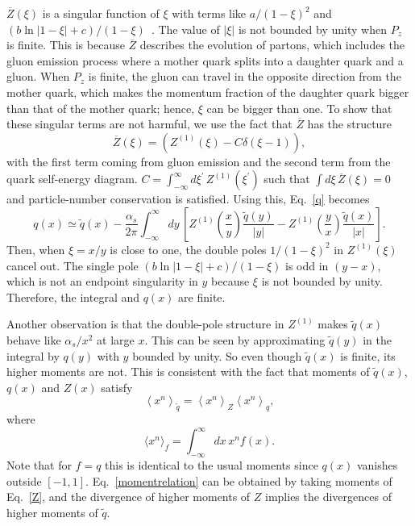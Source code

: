 $\overline{Z}(\xi)$ is a singular function of $\xi$ with terms like
$a/\left(1-\xi\right)^2$ and
$\left(b\ln \left\vert 1-\xi \right\vert + c\right)/(1-\xi)$~\cite{Xiong:2013bka}. The value of $\left\vert \xi \right\vert$ is not bounded by unity when $P_z$ is
finite. This is because $\overline{Z}$ describes the evolution of partons, which
includes the gluon emission process where a mother quark splits into a daughter
quark and a gluon. When $P_z$ is finite, the gluon can travel in the opposite
direction from the mother quark, which makes the momentum fraction of the
daughter quark bigger than that of the mother quark; hence, $\xi$ can be bigger
than one. To show that these singular terms are not harmful, we use the fact
that $\overline{Z}$ has the structure
%
\begin{equation}
\overline{Z}(\xi) = \left(Z^{(1)}(\xi) - C\delta(\xi-1)\right),
\end{equation}
%
with the first term coming from gluon emission and the second term from the quark
self-energy diagram. $C=\int_{-\infty}^{\infty}\!d\xi^{\prime}\,Z^{(1)}(\xi
^{\prime})$ such that $\int\!d\xi\,\overline{Z}(\xi)=0$ and particle-number
conservation is satisfied. Using this, Eq.~\ref{q} becomes
%
\begin{equation}
q(x) \simeq \widetilde{q}(x)
  - \frac{\alpha_s}{2\pi} \int_{-\infty}^{\infty}\!dy\,
  \left[ Z^{(1)}\!\left(\frac{x}{y}\right)
    \frac{\widetilde{q}(y)}{\left\vert y\right\vert}
  - Z^{(1)}\!\left(\frac{y}{x}\right)
    \frac{\widetilde{q}(x)}{\left\vert x\right\vert}\right] .  \label{cov}
\end{equation}
%
Then, when $\xi=x/y$ is close to one, the double poles
$1/\left(1-\xi\right)^2$ in $Z^{(1)}(\xi)$ cancel out. The single pole
$\left(b\ln \left\vert 1-\xi \right\vert + c\right)/(1-\xi)$ is odd in $(y-x)$,
which is not an endpoint singularity in $y$ because $\xi$ is not bounded
by unity. Therefore, the integral and $q(x)$ are finite.

Another observation is that the double-pole structure in $Z^{(1)}$ makes
$\widetilde{q}(x)$ behave like $\alpha_s/x^2$ at large $x$. This can be
seen by approximating $\widetilde{q}(y)$ in the integral by $q(y)$ with $y$
bounded by unity. So even though $\widetilde{q}(x)$ is finite, its higher
moments are not. This is consistent with the fact that moments of
$\tilde{q}(x)$, $q(x)$ and $Z(x)$ satisfy
%
\begin{equation}\label{momentrelation}
\left\langle x^n \right\rangle_{\tilde{q}} =
  \left\langle x^n \right\rangle_Z \left\langle x^n \right\rangle_q,
\end{equation}
%
where
\begin{equation}
\langle x^{n}\rangle_{f}=\int_{-\infty}^{\infty}dx\,x^{n}f(x).
\end{equation}
Note that for $f=q$ this is identical to the usual moments since $q(x)$ vanishes outside $[-1,1]$. Eq.~\ref{momentrelation} can be obtained by taking moments of Eq.~\ref{Z}, and the divergence
of higher moments of $Z$ implies the divergences of higher moments of $\tilde{q}$.

